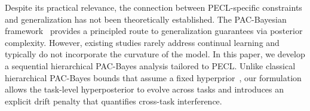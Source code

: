 \documentclass{article}
\theoremstyle{plain}
\theoremstyle{definition}
\theoremstyle{remark}
\begin{document}














Despite its practical relevance, the connection between PECL-specific constraints and generalization has not been theoretically established. The PAC-Bayesian framework~\cite{mcallesterPACBayesianStochasticModel2003,pentinaPACBayesianBoundLifelong2014,germainPACBayesianTheoryMeets2016,NEURIPS2024_xinrui} provides a principled route to generalization guarantees via posterior complexity. However, existing studies rarely address continual learning and typically do not incorporate the curvature of the model. 
In this paper, we develop a sequential hierarchical PAC-Bayes analysis tailored to PECL. Unlike classical hierarchical PAC-Bayes bounds that assume a fixed hyperprior~\cite{pentinaPACBayesianBoundLifelong2014}, our formulation allows the task-level hyperposterior to evolve across tasks and introduces an explicit drift penalty that quantifies cross-task interference. 
\end{document}
